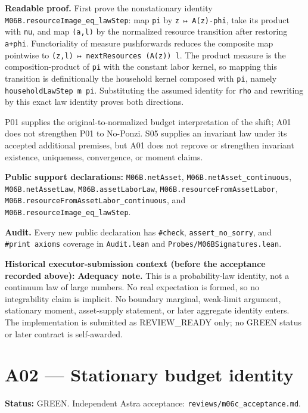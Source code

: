 \documentclass[
  11pt,
]{article}
\let\LedgerOriginalTexttt\texttt
\renewcommand{\texttt}[1]{{\small\LedgerOriginalTexttt{#1}}}
\begin{document}
\textbf{Readable proof.} First prove the nonstationary identity
\texttt{M06B.resourceImage\_eq\_lawStep}: map \texttt{pi} by
\texttt{z\ ↦\ A(z)-phi}, take its product with \texttt{nu}, and map
\texttt{(a,l)} by the normalized resource transition after restoring
\texttt{a+phi}. Functoriality of measure pushforwards reduces the
composite map pointwise to \texttt{(z,l)\ ↦\ nextResources\ (A(z))\ l}.
The product measure is the composition-product of \texttt{pi} with the
constant labor kernel, so mapping this transition is definitionally the
household kernel composed with \texttt{pi}, namely
\texttt{householdLawStep\ m\ pi}. Substituting the assumed identity for
\texttt{rho} and rewriting by this exact law identity proves both
directions.

P01 supplies the original-to-normalized budget interpretation of the
shift; A01 does not strengthen P01 to No-Ponzi. S05 supplies an
invariant law under its accepted additional premises, but A01 does not
reprove or strengthen invariant existence, uniqueness, convergence, or
moment claims.

\textbf{Public support declarations:} \texttt{M06B.netAsset},
\texttt{M06B.netAsset\_continuous}, \texttt{M06B.netAssetLaw},
\texttt{M06B.assetLaborLaw}, \texttt{M06B.resourceFromAssetLabor},
\texttt{M06B.resourceFromAssetLabor\_continuous}, and
\texttt{M06B.resourceImage\_eq\_lawStep}.

\textbf{Audit.} Every new public declaration has \texttt{\#check},
\texttt{assert\_no\_sorry}, and \texttt{\#print\ axioms} coverage in
\texttt{Audit.lean} and \texttt{Probes/M06BSignatures.lean}.

\textbf{Historical executor-submission context (before the acceptance
recorded above):} \textbf{Adequacy note.} This is a probability-law
identity, not a continuum law of large numbers. No real expectation is
formed, so no integrability claim is implicit. No boundary marginal,
weak-limit argument, stationary moment, asset-supply statement, or later
aggregate identity enters. The implementation is submitted as
REVIEW\_READY only; no GREEN status or later contract is self-awarded.

\section{A02 --- Stationary budget
identity}\label{a02-stationary-budget-identity}

\textbf{Status:} GREEN. Independent Astra acceptance:
\texttt{reviews/m06c\_acceptance.md}.
\end{document}
